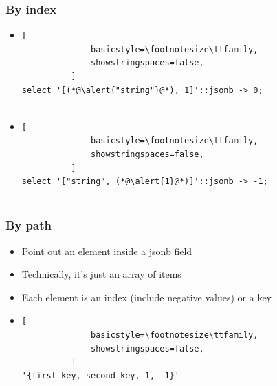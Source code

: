 \documentclass[14pt, compress, aspectratio=169]{beamer}
\begin{document}
\begin{frame}[fragile]
  \frametitle{By index}

  \begin{itemize}
      \item
          \begin{lstlisting}[
              basicstyle=\footnotesize\ttfamily,
              showstringspaces=false,
          ]
select '[(*@\alert{"string"}@*), 1]'::jsonb -> 0;
         
          \end{lstlisting}

      \item
          \begin{lstlisting}[
              basicstyle=\footnotesize\ttfamily,
              showstringspaces=false,
          ]
select '["string", (*@\alert{1}@*)]'::jsonb -> -1;
         
          \end{lstlisting}

  \end{itemize}

\end{frame}

\begin{frame}[fragile]
  \frametitle{By path}

  \begin{itemize}
      \item[\MVRightarrow] Point out an element inside a jsonb field
      \item[\MVRightarrow] Technically, it's just an array of items
      \item[\MVRightarrow] Each element is an index (include negative values) or a key
      \item
          \begin{lstlisting}[
              basicstyle=\footnotesize\ttfamily,
              showstringspaces=false,
          ]
'{first_key, second_key, 1, -1}'
         
          \end{lstlisting}

  \end{itemize}

\end{frame}
\end{document}

